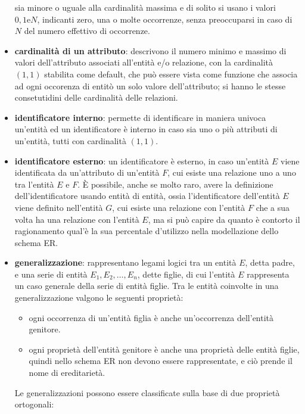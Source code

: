 \documentclass[a4paper,12pt, oneside]{book}
\begin{document}
\begin{itemize}
          sia minore o uguale alla cardinalità massima e di solito si usano i valori $0, 1 \text{e} N$, indicanti
          zero, una o molte occorrenze, senza preoccuparsi in caso di $N$ del numero effettivo di occorrenze.
  \item \textbf{cardinalità di un attributo}: descrivono il numero minimo e massimo di valori dell'attributo 
            associati all'entità e/o relazione, con la cardinalità $(1, 1)$ stabilita come default,
          che può essere vista come funzione che associa ad ogni occorenza di entitò un solo valore dell'attributo;
          si hanno le stesse consetutidini delle cardinalità delle relazioni.
  \item \textbf{identificatore interno}: permette di identificare in maniera univoca un'entità ed un identificatore è interno
          in caso sia uno o più attributi di un'entità, tutti con cardinalità $(1, 1)$.
  \item \textbf{identificatore esterno}: un identificatore è esterno, in caso un'entità $E$  viene identificata da un'attributo
          di un'entità $F$, cui esiste una relazione uno a uno tra l'entità $E$ e $F$.\newline
          È possibile, anche se molto raro, avere la definizione dell'identificatore usando entità di entità, ossia 
          l'identificatore dell'entità $E$ viene definito nell'entità $G$, cui esiste una relazione con l'entità $F$
          che a sua volta ha una relazione con l'entità $E$, ma si può capire da quanto è contorto il ragionamento 
          qual'è la sua percentale d'utilizzo nella modellazione dello schema ER.
  \item \textbf{generalizzazione}: rappresentano legami logici tra un entità $E$, detta padre, e una serie di entità $E_1, E_2, \dots, E_n$,
          dette figlie, di cui l'entità $E$ rappresenta un caso generale della serie di entità figlie.\newline
          Tra le entità coinvolte in una generalizzazione valgono le seguenti proprietà:
          \begin{itemize}
            \item ogni occorrenza di un'entità figlia è anche un'occorrenza dell'entità genitore.
            \item ogni proprietà dell'entità genitore è anche una proprietà delle entità figlie, quindi
                  nello schema ER non devono essere rappresentate, e ciò prende il nome di ereditarietà.
          \end{itemize}
          Le generalizzazioni possono essere classificate sulla base di due proprietà ortogonali:

\end{itemize}
\end{document}
